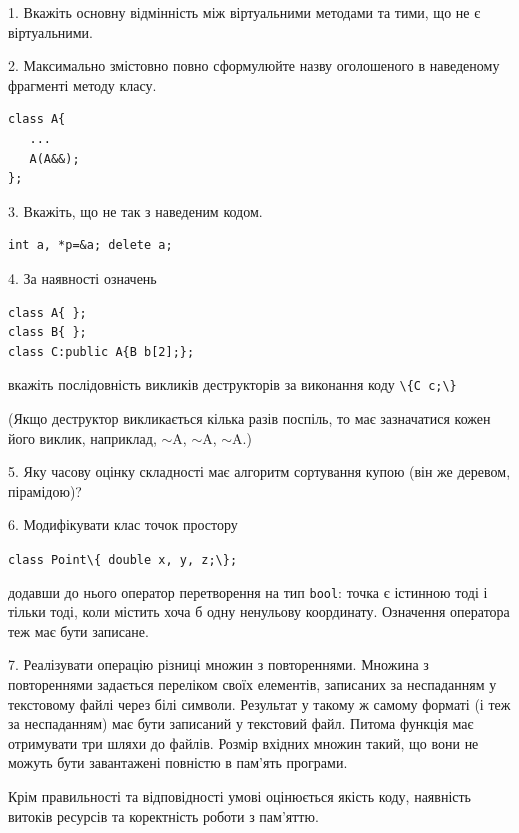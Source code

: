\documentclass[12pt, ukrainian]{article}
\def\code#1{\Verb!#1!}
\begin{document}
{%
1. Вкажіть основну відмінність між віртуальними методами та тими, що не є віртуальними.%
\par
\vspace{2mm}
2. Максимально змістовно повно сформулюйте назву оголошеного в наведеному фрагменті методу класу.
\vspace{-3mm}
\begin{verbatim}class A{
   ...
   A(A&&);
};\end{verbatim}
\vspace{-3mm}
\par
\vspace{2mm}
3. Вкажіть, що не так з наведеним кодом.
\vspace{-3mm}
\begin{verbatim}int a, *p=&a; delete a;\end{verbatim}
\vspace{-3mm}
\par
\vspace{2mm}
4. За наявності означень
\vspace{-3mm}
\begin{verbatim}
class A{ };
class B{ };
class C:public A{B b[2];};\end{verbatim}
\vspace{-3mm}
вкажіть послідовність викликів деструкторів за виконання коду \code{\{C c;\}} 

(Якщо деструктор викликається кілька разів поспіль, то має зазначатися кожен його виклик, наприклад, $\sim$A, $\sim$A, $\sim$A.)

\vspace{2mm}
5. Яку часову оцінку складності має алгоритм сортування купою (він же деревом, пірамідою)?
\par
\vspace{2mm}
6. Модифікувати клас точок простору 

\qquad\code{class Point\{ double x, y, z;\};}


додавши до нього оператор перетворення на тип \code{bool}: точка є істинною тоді і тільки тоді, коли містить хоча б одну ненульову координату. Означення оператора теж має бути записане.%
\par
\vspace{2mm}
7. 
Реалізувати операцію різниці множин з повтореннями. Множина з повтореннями задається переліком своїх елементів, записаних за неспаданням у текстовому файлі через білі символи. Результат у такому ж самому форматі (і теж за неспаданням) має бути записаний у текстовий файл. Питома функція має отримувати три шляхи до файлів. Розмір вхідних множин такий, що вони не можуть бути завантажені повністю в пам’ять програми.

Крім правильності та відповідності умові оцінюється якість коду, наявність витоків ресурсів та коректність роботи з пам'яттю. 

}
\end{document}
